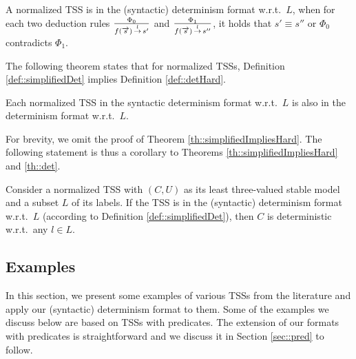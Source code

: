 \begin{definition}
A normalized TSS is in the (syntactic) determinism format w.r.t.\ $L$, when
    for each two deduction rules $\frac{\Phi_0}{f(\overrightarrow{s}) \,{\stackrel{{l}}{\rightarrow}}\, s'}$ and $\frac{\Phi_1}{f(\overrightarrow{s})  \,{\stackrel{{l}}{\rightarrow}}\, s''}$, it holds that $s' \equiv s''$ or $\Phi_0$ contradicts $\Phi_1$.
\end{definition}

The following theorem states that for normalized TSSs, Definition \ref{def::simplifiedDet} implies Definition \ref{def::detHard}.


\begin{theorem}\label{th::simplifiedImpliesHard}
Each normalized TSS in the syntactic determinism format w.r.t.\ $L$ is also in the determinism format w.r.t.\ $L$.
\end{theorem}

For brevity, we omit the proof of Theorem \ref{th::simplifiedImpliesHard}.
The following statement is thus a corollary to Theorems \ref{th::simplifiedImpliesHard} and \ref{th::det}.

\begin{corollary}
Consider a normalized TSS with $(C, U)$ as its least three-valued stable model and a subset $L$ of its labels. If the TSS is in the (syntactic) determinism format w.r.t.\ $L$ (according to Definition \ref{def::simplifiedDet}), then $C$ is deterministic w.r.t.\ any $l\in L$.
\end{corollary}


\subsection{Examples\label{sec::detExamples}}
In this section, we present some examples of various TSSs from the literature and apply our (syntactic) determinism format to them.
Some of the examples we discuss below are based on TSSs with predicates. The extension of our formats with predicates is
straightforward and we discuss it in Section \ref{sec::pred} to follow.


